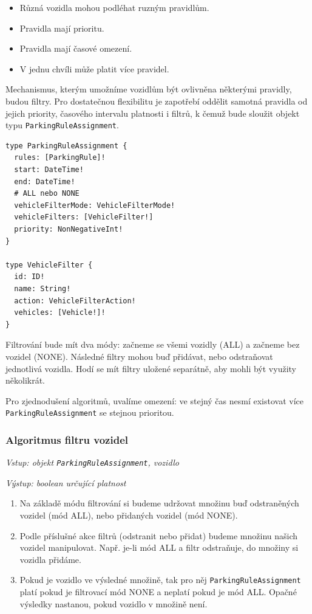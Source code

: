 \begin{itemize}
  \setlength\itemsep{.05em}
  \item Různá vozidla mohou podléhat ruzným pravidlům.
  \item Pravidla mají prioritu.
  \item Pravidla mají časové omezení.
  \item V jednu chvíli může platit více pravidel.
\end{itemize}

Mechanismus, kterým umožníme vozidlům být ovlivněna některými pravidly,
budou filtry.
Pro dostatečnou flexibilitu je zapotřebí oddělit samotná pravidla od jejich
priority, časového intervalu platnosti i filtrů,
k čemuž bude sloužit objekt typu \texttt{ParkingRuleAssignment}.

\begin{lstlisting}
type ParkingRuleAssignment {
  rules: [ParkingRule]!
  start: DateTime!
  end: DateTime!
  # ALL nebo NONE
  vehicleFilterMode: VehicleFilterMode!
  vehicleFilters: [VehicleFilter!]
  priority: NonNegativeInt!
}

type VehicleFilter {
  id: ID!
  name: String!
  action: VehicleFilterAction!
  vehicles: [Vehicle!]!
}
\end{lstlisting}

Filtrování bude mít dva módy: začneme se všemi vozidly (ALL) a začneme bez vozidel (NONE).
Následné filtry mohou buď přidávat, nebo odstraňovat jednotlivá vozidla.
Hodí se mít filtry uložené separátně, aby mohli být využity několikrát.

Pro zjednodušení algoritmů, uvalíme omezení: ve stejný čas nesmí existovat více \texttt{ParkingRuleAssignment}
se stejnou prioritou.

\subsubsection*{Algoritmus filtru vozidel}

\textit{Vstup: objekt \texttt{ParkingRuleAssignment}, vozidlo}

\textit{Výstup: boolean určující platnost}
\begin{enumerate}
  \setlength\itemsep{.05em}
  \item Na základě módu filtrování si budeme udržovat množinu buď odstraněných vozidel (mód ALL), nebo přidaných vozidel (mód NONE).
  \item Podle příslušné akce filtrů (odstranit nebo přidat) budeme množinu našich vozidel manipulovat. Např. je-li mód ALL a filtr odstraňuje, do množiny si vozidla přidáme.
  \item Pokud je vozidlo ve výsledné množině, tak pro něj \texttt{ParkingRuleAssignment} platí pokud je filtrovací mód NONE a neplatí pokud je mód ALL. Opačné výsledky nastanou, pokud vozidlo v množině není.
\end{enumerate}

